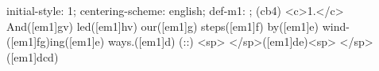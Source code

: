 initial-style: 1;
centering-scheme: english;
def-m1: \grealign;
(cb4) <c>1.</c> And([em1]gv) led([em1]hv) our([em1]g) steps([em1]f) by([em1]e) wind-([em1]fg)ing([em1]e) ways.([em1]d) (::) <sp> </sp>([em1]de)<sp> </sp>([em1]dcd)